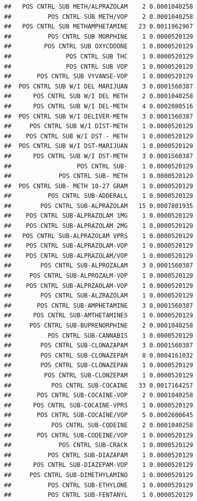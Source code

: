 \documentclass[]{book}
\begin{document}
\begin{verbatim}
##   POS CNTRL SUB METH/ALPRAZOLAM    2 0.0001040258
##          POS CNTRL SUB METH/VOP    2 0.0001040258
##   POS CNTRL SUB METHAMPHETAMINE   23 0.0011962967
##          POS CNTRL SUB MORPHINE    1 0.0000520129
##         POS CNTRL SUB OXYCODONE    1 0.0000520129
##               POS CNTRL SUB THC    1 0.0000520129
##               POS CNTRL SUB VOP    1 0.0000520129
##       POS CNTRL SUB VYVANSE-VOP    1 0.0000520129
##  POS CNTRL SUB W/I DEL MARIJUAN    3 0.0001560387
##      POS CNTRL SUB W/I DEL METH    2 0.0001040258
##      POS CNTRL SUB W/I DEL-METH    4 0.0002080516
##  POS CNTRL SUB W/I DELIVER-METH    3 0.0001560387
##     POS CNTRL SUB W/I DIST-METH    1 0.0000520129
##    POS CNTRL SUB W/I DST - METH    1 0.0000520129
##  POS CNTRL SUB W/I DST-MARIJUAN    1 0.0000520129
##      POS CNTRL SUB W/I DST-METH    3 0.0001560387
##                  POS CNTRL SUB-    1 0.0000520129
##             POS CNTRL SUB- METH    1 0.0000520129
##  POS CNTRL SUB- METH 10-27 GRAM    1 0.0000520129
##          POS CNTRL SUB-ADDERALL    1 0.0000520129
##        POS CNTRL SUB-ALPRAZOLAM   15 0.0007801935
##    POS CNTRL SUB-ALPRAZOLAM 1MG    1 0.0000520129
##    POS CNTRL SUB-ALPRAZOLAM 2MG    1 0.0000520129
##   POS CNTRL SUB-ALPRAZOLAM VPRS    1 0.0000520129
##    POS CNTRL SUB-ALPRAZOLAM-VOP    1 0.0000520129
##    POS CNTRL SUB-ALPRAZOLAM/VOP    1 0.0000520129
##        POS CNTRL SUB-ALPROZALAM    3 0.0001560387
##     POS CNTRL SUB-ALPROZALM-VOP    1 0.0000520129
##    POS CNTRL SUB-ALPRZAOLAM-VOP    1 0.0000520129
##        POS CNTRL SUB-ALZRAZOLAM    1 0.0000520129
##       POS CNTRL SUB-AMPHETAMINE    3 0.0001560387
##      POS CNTRL SUB-AMTHETAMINES    1 0.0000520129
##     POS CNTRL SUB-BUPRENORPHINE    2 0.0001040258
##          POS CNTRL SUB-CANNABIS    1 0.0000520129
##        POS CNTRL SUB-CLONAZAPAM    3 0.0001560387
##        POS CNTRL SUB-CLONAZEPAM    8 0.0004161032
##        POS CNTRL SUB-CLONAZEPAN    1 0.0000520129
##         POS CNTRL SUB-CLONZEPAM    1 0.0000520129
##           POS CNTRL SUB-COCAINE   33 0.0017164257
##       POS CNTRL SUB-COCAINE-VOP    2 0.0001040258
##      POS CNTRL SUB-COCAINE-VPRS    1 0.0000520129
##       POS CNTRL SUB-COCAINE/VOP    5 0.0002600645
##           POS CNTRL SUB-CODEINE    2 0.0001040258
##       POS CNTRL SUB-CODEINE/VOP    1 0.0000520129
##             POS CNTRL SUB-CRACK    1 0.0000520129
##          POS CNTRL SUB-DIAZAPAM    1 0.0000520129
##      POS CNTRL SUB-DIAZEPAM-VOP    1 0.0000520129
##     POS CNTRL SUB-DIMETHYLAMINO    1 0.0000520129
##          POS CNTRL SUB-ETHYLONE    1 0.0000520129
##          POS CNTRL SUB-FENTANYL    1 0.0000520129

\end{verbatim}
\end{document}

